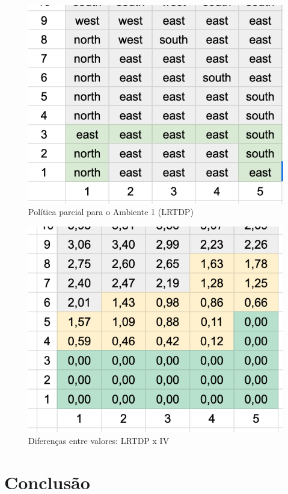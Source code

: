 \documentclass[letterpaper]{article}
\begin{document}
\begin{figure}[t]
    \centering
    \includegraphics[width=0.9\columnwidth]{partial-policy}
    \caption{Política parcial para o Ambiente 1 (LRTDP)}
    \label{fig:partial-policy}
\end{figure}

\begin{figure}[t]
    \centering
    \includegraphics[width=0.9\columnwidth]{policy-differences}
    \caption{Diferenças entre valores: LRTDP x IV}
    \label{fig:policy-differences}
\end{figure}

\section{Conclusão}
\end{document}
